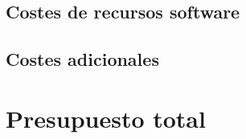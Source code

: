 \subsection{Costes de recursos software}





\subsection{Costes adicionales}





\section{Presupuesto total}































